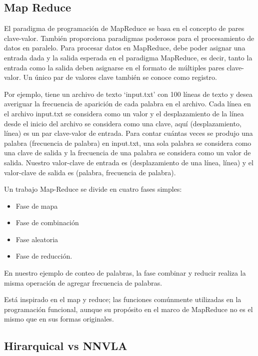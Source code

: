 \documentclass[10pt, fleqn, journal]{IEEEtran}
\theoremstyle{break}                                            %
\begin{document}
    \subsection{Map Reduce}
      El paradigma de programación de MapReduce se basa en el concepto de pares clave-valor.
      También proporciona paradigmas poderosos para el procesamiento de datos en paralelo.
      Para procesar datos en MapReduce, debe poder asignar una entrada dada y la salida esperada en el paradigma
       MapReduce, es decir, tanto la entrada como la salida deben asignarse en el formato de múltiples pares 
       clave-valor. Un único par de valores clave también se conoce como registro.

      Por ejemplo, tiene un archivo de texto ‘input.txt’ con 100 líneas de texto y desea averiguar la frecuencia 
      de aparición de cada palabra en el archivo. Cada línea en el archivo input.txt se considera como un valor 
      y el desplazamiento de la línea desde el inicio del archivo se considera como una clave, aquí (desplazamiento, 
      línea) es un par clave-valor de entrada. Para contar cuántas veces se produjo una palabra (frecuencia de 
      palabra) en input.txt, una sola palabra se considera como una clave de salida y la frecuencia de una 
      palabra se considera como un valor de salida. Nuestro valor-clave de entrada es (desplazamiento de 
      una línea, línea) y el valor-clave de salida es (palabra, frecuencia de palabra).

      Un trabajo Map-Reduce se divide en cuatro fases simples: 
      \begin{itemize}
        \item Fase de mapa
        \item Fase de combinación
        \item Fase aleatoria
        \item Fase de reducción. 
      \end{itemize}
      
      En nuestro ejemplo de conteo de palabras, la fase combinar y reducir realiza la misma operación de 
      agregar frecuencia de palabras. 

      Está inspirado en el map y reduce; las funciones comúnmente utilizadas en la programación funcional, 
      aunque su propósito en el marco de MapReduce no es el mismo que en sus formas originales. 
      
    \subsection{Hirarquical vs NNVLA}
\end{document}
